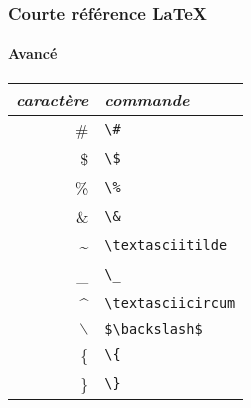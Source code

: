 \begin{frame}[fragile]
  \frametitle{Courte référence \LaTeX{}}
  \framesubtitle{Avancé}


  \begin{center}
    \begin{tabular}{rl}
      \emph{caractère} & \emph{commande} \\ \hline
      \# & \verb|\#| \\
      \$ & \verb|\$| \\
      \% & \verb|\%| \\
      \& & \verb|\&| \\
      \textasciitilde & \verb|\textasciitilde| \\
      \_ & \verb|\_| \\
      \textasciicircum & \verb|\textasciicircum| \\
      $\backslash$ & \verb|$\backslash$| \\
      \{ & \verb|\{| \\
      \} & \verb|\}| \\
    \end{tabular}
  \end{center}
\end{frame}

